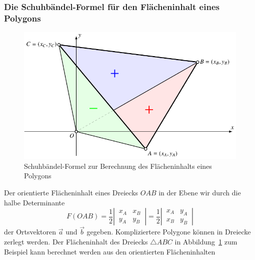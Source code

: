 \subsubsection{Die Schuhbändel-Formel für den Flächeninhalt eines Polygons}
\begin{figure}
\centering
\includegraphics{5/images/schuhbaendel.pdf}
\caption{Schuhbändel-Formel zur Berechnung des Flächeninhalts eines
Polygons
\label{skript:orientierung:schuhbaendel}}
\end{figure}
Der orientierte Flächeninhalt eines Dreiecks $OAB$ in der Ebene wir durch
die halbe Determinante
\[
F(OAB)
=
\frac12\left|\,\begin{matrix} x_A&x_B\\y_A&y_B\end{matrix}\,\right|
=
\frac12\left|\,\begin{matrix} x_A&y_A\\x_B&y_B\end{matrix}\,\right|
\]
der Ortsvektoren $\vec{a}$ und $\vec{b}$ gegeben.
Kompliziertere Polygone können in Dreiecke zerlegt werden.
Der Flächeninhalt des Dreiecks $\triangle ABC$ in
Abbildung~\ref{skript:orientierung:schuhbaendel} zum 
Beispiel kann berechnet werden aus den orientierten Flächeninhalten
